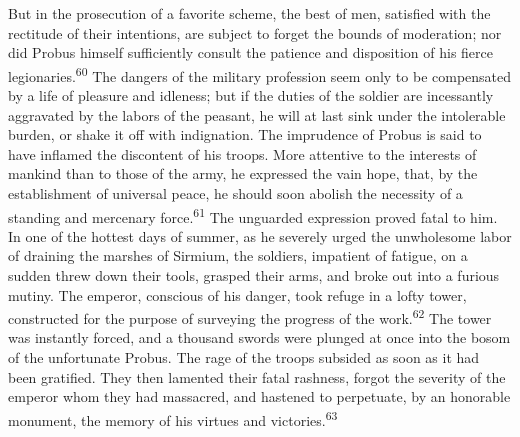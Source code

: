 But in the prosecution of a favorite scheme, the best of men,
satisfied with the rectitude of their intentions, are subject to
forget the bounds of moderation; nor did Probus himself
sufficiently consult the patience and disposition of his fierce
legionaries.\textsuperscript{60} The dangers of the military profession seem only
to be compensated by a life of pleasure and idleness; but if the
duties of the soldier are incessantly aggravated by the labors of
the peasant, he will at last sink under the intolerable burden,
or shake it off with indignation. The imprudence of Probus is
said to have inflamed the discontent of his troops. More
attentive to the interests of mankind than to those of the army,
he expressed the vain hope, that, by the establishment of
universal peace, he should soon abolish the necessity of a
standing and mercenary force.\textsuperscript{61} The unguarded expression proved
fatal to him. In one of the hottest days of summer, as he
severely urged the unwholesome labor of draining the marshes of
Sirmium, the soldiers, impatient of fatigue, on a sudden threw
down their tools, grasped their arms, and broke out into a
furious mutiny. The emperor, conscious of his danger, took refuge
in a lofty tower, constructed for the purpose of surveying the
progress of the work.\textsuperscript{62} The tower was instantly forced, and a
thousand swords were plunged at once into the bosom of the
unfortunate Probus. The rage of the troops subsided as soon as it
had been gratified. They then lamented their fatal rashness,
forgot the severity of the emperor whom they had massacred, and
hastened to perpetuate, by an honorable monument, the memory of
his virtues and victories.\textsuperscript{63}






